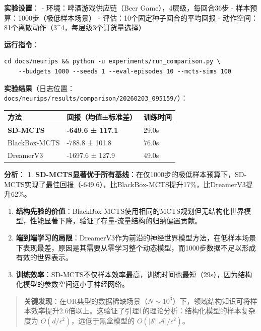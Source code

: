 \documentclass[UTF8]{ctexart}
\begin{document}
\textbf{实验设置}： - 环境：啤酒游戏供应链（Beer
Game），4层级，每回合36步 - 样本预算：1000步（极低样本场景） -
评估：10个固定种子回合的平均回报 -
动作空间：81个离散动作（3\^{}4，每层级3个订货量选择）

\textbf{运行指令}：

\begin{verbatim}
cd docs/neurips && python -u experiments/run_comparison.py \
    --budgets 1000 --seeds 1 --eval-episodes 10 --mcts-sims 100
\end{verbatim}

\textbf{实验结果}（日志位置：\texttt{docs/neurips/results/comparison/20260203\_095159/}）：

\begin{table}[h]
\centering
\begin{tabular}{p{3.5cm}p{6cm}p{4cm}}
\toprule
\textbf{方法} & \textbf{回报（均值±标准差）} & \textbf{训练时间} \\
\midrule
\textbf{SD-MCTS} & \textbf{-649.6 ± 117.1} & 29.0s \\
BlackBox-MCTS & -788.8 ± 101.8 & 76.0s \\
DreamerV3 & -1697.6 ± 127.9 & 49.0s \\
\bottomrule
\end{tabular}
\end{table}

\textbf{分析}： 1.
\textbf{SD-MCTS显著优于所有基线}：在仅1000步的极低样本预算下，SD-MCTS实现了最佳回报（-649.6），比BlackBox-MCTS提升17\%，比DreamerV3提升62\%。

\begin{enumerate}
\def\labelenumi{\arabic{enumi}.}
\setcounter{enumi}{1}
\item
  \textbf{结构先验的价值}：BlackBox-MCTS使用相同的MCTS规划但无结构化世界模型，性能显著下降，验证了存量-流量结构的归纳偏置贡献。
\item
  \textbf{端到端学习的局限}：DreamerV3作为前沿的神经世界模型方法，在低样本场景下表现最差，原因是其需要从零学习整个动态模型，而1000步数据不足以形成有效的世界表示。
\item
  \textbf{训练效率}：SD-MCTS不仅样本效率最高，训练时间也最短（29s），因为结构化模型的参数空间远小于神经网络。
\end{enumerate}

\begin{quote}
\textbf{关键发现}：在OR典型的数据稀缺场景（\(N \sim 10^3\)）下，领域结构知识可将样本效率提升2.6倍以上。这验证了引理1的理论分析：结构化模型的样本复杂度为
\(O(d/\epsilon^2)\)，远低于黑盒模型的
\(O(|\mathcal{S}||\mathcal{A}|/\epsilon^2)\)。
\end{quote}
\end{document}
